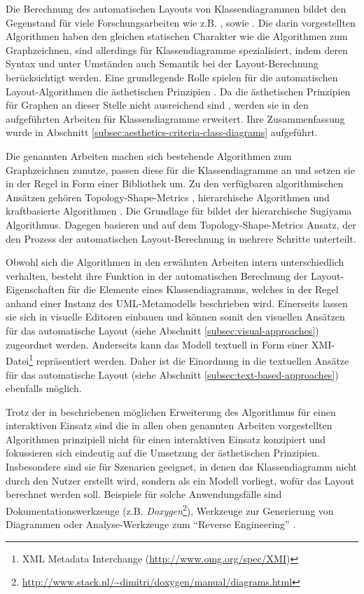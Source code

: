 Die Berechnung des automatischen Layouts von Klassendiagrammen bildet den Gegenstand für viele Forschungsarbeiten wie z.B. \cite{Eichelberger05Aesthetics}, \cite{Siebenhaller03Automatisches} sowie \cite{Eiglsperger04Automatic}. Die darin vorgestellten Algorithmen haben den gleichen statischen Charakter wie die Algorithmen zum Graphzeichnen, sind allerdings für Klassendiagramme spezialisiert, indem deren Syntax und unter Umständen auch Semantik bei der Layout-Berechnung berücksichtigt werden. Eine grundlegende Rolle spielen für die automatischen Layout-Algorithmen die ästhetischen Prinzipien \cite{Maier12A-Pattern-based}. Da die ästhetischen Prinzipien für Graphen an dieser Stelle nicht ausreichend sind \cite[S.79]{Eichelberger05Aesthetics}, werden sie in den aufgeführten Arbeiten für Klassendiagramme erweitert. Ihre Zusammenfassung wurde in Abschnitt \ref{subsec:aesthetics-criteria-class-diagrams} aufgeführt.

Die genannten Arbeiten machen sich bestehende Algorithmen zum Graphzeichnen zunutze, passen diese für die Klassendiagramme an und setzen sie in der Regel in Form einer Bibliothek um. Zu den verfügbaren algorithmischen Ansätzen gehören Topology-Shape-Metrics \cite[S.33]{Siebenhaller03Automatisches}, hierarchische Algorithmen und kraftbasierte Algorithmen \cite[S.32ff]{Eichelberger05Aesthetics}. Die Grundlage für \cite{Eichelberger05Aesthetics} bildet der hierarchische Sugiyama Algorithmus. Dagegen basieren \cite{Siebenhaller03Automatisches} und \cite{Eiglsperger04Automatic} auf dem Topology-Shape-Metrics Ansatz, der den Prozess der automatischen Layout-Berechnung in mehrere Schritte unterteilt.

Obwohl sich die Algorithmen in den erwähnten Arbeiten intern unterschiedlich verhalten, besteht ihre Funktion in der automatischen Berechnung der Layout-Eigenschaften für die Elemente eines Klassendiagramms, welches in der Regel anhand einer Instanz des UML-Metamodells beschrieben wird. Einerseits lassen sie sich in visuelle Editoren einbauen und können somit den visuellen Ansätzen für das automatische Layout (siehe Abschnitt \ref{subsec:visual-approaches}) zugeordnet werden. Anderseits kann das Modell textuell in Form einer XMI-Datei\footnote{XML Metadata Interchange (\url{http://www.omg.org/spec/XMI})} repräsentiert werden. Daher ist die Einordnung in die textuellen Ansätze für das automatische Layout (siehe Abschnitt \ref{subsec:text-based-approaches}) ebenfalls möglich.

Trotz der in \cite{Eiglsperger04Automatic} beschriebenen möglichen Erweiterung des Algorithmus für einen interaktiven Einsatz sind die in allen oben genannten Arbeiten vorgestellten Algorithmen prinzipiell nicht für einen interaktiven Einsatz konzipiert und fokussieren sich eindeutig auf die Umsetzung der ästhetischen Prinzipien. Insbesondere sind sie für Szenarien geeignet, in denen das Klassendiagramm nicht durch den Nutzer erstellt wird, sondern als ein Modell vorliegt, wofür das Layout berechnet werden soll. Beispiele für solche Anwendungsfälle sind Dokumentationswerkzeuge (z.B. \textit{Doxygen}\footnote{\url{http://www.stack.nl/~dimitri/doxygen/manual/diagrams.html}}), Werkzeuge zur Generierung von Diagrammen oder Analyse-Werkzeuge zum \enquote{Reverse Engineering} \cite{Eiglsperger04Automatic}.


